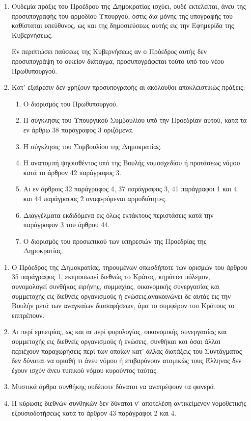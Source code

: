 \documentclass[twoside, a4paper, 10pt]{article}
\begin{document}
\begin{multicols}{2}
\begin{enumerate}
\begin{BigQuote}

\begin{enumerate}
  \item[1.] Ουδεμία πράξις του Προέδρου της Δημοκρατίας ισχύει, ουδέ εκτελείται, άνευ της προσυπογραφής του αρμοδίου Υπουργού, όστις δια μόνης της υπογραφής του καθίσταται υπεύθυνος, ως και της δημοσιεύσεως αυτής εις την Εφημερίδα της Κυβερνήσεως.

Εν περιπτώσει παύσεως της Κυβερνήσεως αν ο Πρόεδρος αυτής δεν προσυπογράψη το οικείον διάταγμα, προσυπογράφεται τούτο υπό του νέου Πρωθυπουργού.
  \item[2.] Κατ' εξαίρεσιν δεν χρήζουν προσυπογραφής αι ακόλουθοι αποκλειστικώς πράξεις:
  \begin{enumerate}
  	\item[α)] Ο διορισμός του Πρωθυπουργού.
  	\item[β)] Η σύγκλησις του Υπουργικού Συμβουλίου υπό την Προεδρίαν αυτού, κατά τα εν άρθρω 38 παράγραφος 3 οριζόμενα.
  	\item[γ)] Η σύγκλησις του Συμβουλίου της Δημοκρατίας.
  	\item[δ)] Η αναπομπή ψηφισθέντος υπό της Βουλής νομοσχεδίου ή προτάσεως νόμου κατά το άρθρον 42 παράγραφος 3.
  	\item[ε)]  Αι εν άρθροις 32 παράγραφος 4, 37 παράγραφος 3, 41 παράγραφοι 1 και 4 και 44 παράγραφος 2 αναφερόμεναι αρμοδιότητες.
  	\item[στ)] Διαγγέλματα εκδιδόμενα εις όλως εκτάκτους περιστάσεις κατά την παράγραφον 3 του άρθρου 44.
   	\item[ζ)] Ο διορισμός του προσωπικού των υπηρεσιών της Προεδρίας της Δημοκρατίας.
  \end{enumerate}
\end{enumerate}

\begin{enumerate}
  \item[1.] Ο Πρόεδρος της Δημοκρατίας, τηρουμένων οπωσδήποτε των ορισμών του άρθρου 35 παράγραφος 1, εκπροσωπεί διεθνώς το Κράτος, κηρύττει πόλεμον, συνομολογεί συνθήκας ειρήνης, συμμαχίας, οικονομικής συνεργασίας και συμμετοχής εις διεθνείς οργανισμούς ή ενώσεις,ανακοινώνει δε αυτάς εις την Βουλήν μετά των αναγκαίων διασαφήσεων, άμα το συμφέρον του Κράτους το επιτρέπουν.
  \item[2.] Αι περί εμπειρίας, ως και αι περί φορολογίας, οικονομικής συνεργασίας και συμμετοχής εις διεθνείς οργανισμούς ή ενώσεις, συνθήκαι και όσαι άλλαι περιέχουν παραχωρήσεις περί των οποίων κατ' άλλας διατάξεις του Συντάγματος  δεν δύναται να ορισθή τι άνευ νόμου ή επιβαρύνουν ατομικώς τους Έλληνας δεν έχουν ισχύν άνευ τυπικού νόμου κυρούντος ταύτας.
  \item[3.] Μυστικά άρθρα συνθήκης ουδέποτε δύναται να ανατρέψουν τα φανερά.
  \item[4.] Η κύρωσις διεθνών συνθηκών δεν δύναται ν' αποτελέση αντικείμενον νομοθετικής εξουσιοδοτήσεως κατά το άρθρον 43 παράγραφοι 2 και 4.
\end{enumerate}


\end{BigQuote}
\end{enumerate}
\end{multicols}
\end{document}
